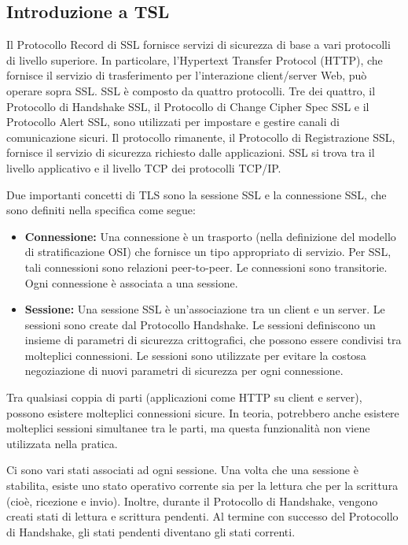 \documentclass{article}
\theoremstyle{definition}
\begin{document}
\subsection{Introduzione a TSL}
Il Protocollo Record di SSL fornisce servizi di sicurezza di base a vari protocolli di livello superiore. In particolare, l'Hypertext Transfer Protocol (HTTP), che fornisce il servizio di trasferimento per l'interazione client/server Web, può operare sopra SSL.
SSL è composto da quattro protocolli. Tre dei quattro, il Protocollo di Handshake SSL, il Protocollo di Change Cipher Spec SSL e il Protocollo Alert SSL, sono utilizzati per impostare e gestire canali di comunicazione sicuri. Il protocollo rimanente, il Protocollo di Registrazione SSL, fornisce il servizio di sicurezza richiesto dalle applicazioni. SSL si trova tra il livello applicativo e il livello TCP dei protocolli TCP/IP.

Due importanti concetti di TLS sono la sessione SSL e la connessione SSL, che sono definiti nella specifica come segue:
\begin{itemize}
    \item \textbf{Connessione:} Una connessione è un trasporto (nella definizione del modello di stratificazione OSI) che fornisce un tipo appropriato di servizio. Per SSL, tali connessioni sono relazioni peer-to-peer. Le connessioni sono transitorie. Ogni connessione è associata a una sessione.
    \item \textbf{Sessione:} Una sessione SSL è un'associazione tra un client e un server. Le sessioni sono create dal Protocollo Handshake. Le sessioni definiscono un insieme di parametri di sicurezza crittografici, che possono essere condivisi tra molteplici connessioni. Le sessioni sono utilizzate per evitare la costosa negoziazione di nuovi parametri di sicurezza per ogni connessione.
\end{itemize}
Tra qualsiasi coppia di parti (applicazioni come HTTP su client e server), possono esistere molteplici connessioni sicure. In teoria, potrebbero anche esistere molteplici sessioni simultanee tra le parti, ma questa funzionalità non viene utilizzata nella pratica.

Ci sono vari stati associati ad ogni sessione. Una volta che una sessione è stabilita, esiste uno stato operativo corrente sia per la lettura che per la scrittura (cioè, ricezione e invio). Inoltre, durante il Protocollo di Handshake, vengono creati stati di lettura e scrittura pendenti. Al termine con successo del Protocollo di Handshake, gli stati pendenti diventano gli stati correnti.
\end{document}
